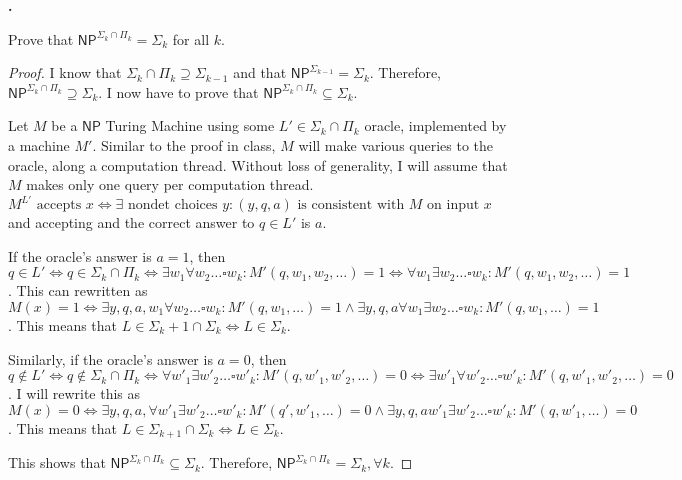 \documentclass[letterpaper,11pt]{article}
\newcommand{\cc}[1]{\ensuremath{\textsf{#1}}\xspace}
\newcommand{\NP}{\cc{NP}}
\newcounter{problem}
\newenvironment{problem}%
{%
	\stepcounter{problem}%
	\textbf{\theproblem.}
	\large
}{\\}%
\newcommand{\tm}{Turing Machine}
\begin{document}
\begin{problem}
Prove that $\NP^{ \Sigma_k \cap \Pi_k } = \Sigma_k$ for all $k$.
\end{problem}


\begin{proof}
I know that $\Sigma_k \cap \Pi_k \supseteq \Sigma_{k-1}$ and that $\NP^{\Sigma_{k-1}} = \Sigma_{k}$. 
Therefore, $\NP^{\Sigma_k \cap \Pi_k} \supseteq \Sigma_k$.
I now have to prove that $\NP^{\Sigma_k \cap \Pi_k} \subseteq \Sigma_k$.

Let $M$ be a $\NP$ \tm{} using some $L' \in \Sigma_k \cap \Pi_k$ oracle, implemented by a machine $M'$.
Similar to the proof in class, $M$ will make various queries to the oracle, along a computation thread.
Without loss of generality, I will assume that $M$ makes only one query per computation thread.
$M^{L'} \mbox{ accepts } x \Leftrightarrow \exists \mbox{ nondet choices } y : (y,q,a) \mbox{ is consistent with } M \mbox{ on input } x$ and accepting and the correct answer to $q \in L'$ is $a$.

If the oracle's answer is $a=1$, then $q \in L' \Leftrightarrow q \in \Sigma_k \cap \Pi_k \Leftrightarrow \exists w_1 \forall w_2 \ldots \square w_k : M'(q,w_1,w_2,\ldots) = 1 \Leftrightarrow \forall w_1 \exists w_2 \ldots \square w_k : M'(q,w_1,w_2,\ldots) = 1$.
This can rewritten as $M(x) = 1 \Leftrightarrow \exists y, q, a, w_1 \forall w_2 \ldots \square w_k : M'(q,w_1,\ldots) = 1 \wedge \exists y, q, a \forall w_1 \exists w_2 \ldots \square w_k : M'(q,w_1,\ldots)=1$. This means that $L \in \Sigma_k+1 \cap \Sigma_k \Leftrightarrow L \in \Sigma_k$.

Similarly, if the oracle's answer is $a=0$, then $q \not \in L' \Leftrightarrow q \not \in \Sigma_k \cap \Pi_k \Leftrightarrow \forall w'_1 \exists w'_2 \ldots \square w'_k : M'(q,w'_1,w'_2,\ldots) = 0 \Leftrightarrow \exists w'_1 \forall w'_2 \ldots \square w'_k : M'(q,w'_1,w'_2,\ldots) = 0$.
I will rewrite this as $M(x) = 0 \Leftrightarrow \exists y, q, a, \forall w'_1 \exists w'_2 \ldots \square w'_k : M'(q',w'_1,\ldots) = 0 \wedge \exists y, q, a w'_1 \exists w'_2 \ldots \square w'_k : M'(q,w'_1,\ldots)=0$.
This means that $L \in \Sigma_{k+1} \cap \Sigma_k \Leftrightarrow L \in \Sigma_k$.

This shows that $\NP^{\Sigma_k \cap \Pi_k} \subseteq \Sigma_k$.
Therefore, $\NP^{\Sigma_k \cap \Pi_k} = \Sigma_{k}, \forall k$.
\end{proof}
\end{document}
